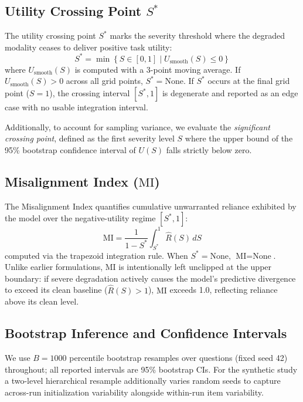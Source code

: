 \documentclass[graybox]{svmult}
\newcommand{\mi}{\text{MI}}
\begin{document}
\subsection{Utility Crossing Point $S^*$}
The utility crossing point $S^*$ marks the severity threshold where the degraded modality ceases to deliver positive task utility:
\begin{equation}
S^* = \min \left\{ S \in [0, 1] \mid U_{\text{smooth}}(S) \le 0 \right\}
\end{equation}
where $U_{\text{smooth}}(S)$ is computed with a 3-point moving average. If $U_{\text{smooth}}(S) > 0$ across all grid points, $S^* = \text{None}$. If $S^*$ occurs at the final grid point ($S=1$), the crossing interval $[S^*, 1]$ is degenerate and reported as an edge case with no usable integration interval.

Additionally, to account for sampling variance, we evaluate the \emph{significant crossing point}, defined as the first severity level $S$ where the upper bound of the 95\% bootstrap confidence interval of $U(S)$ falls strictly below zero.

\subsection{Misalignment Index ($\mi$)}
The Misalignment Index quantifies cumulative unwarranted reliance exhibited by the model over the negative-utility regime $[S^*, 1]$:
\begin{equation}
\mi = \frac{1}{1 - S^*} \int_{S^*}^1 \hat{R}(S) \, dS
\end{equation}
computed via the trapezoid integration rule. When $S^* = \text{None}$, $\mi = \text{None}$.
Unlike earlier formulations, $\mi$ is intentionally left unclipped at the upper boundary: if severe degradation actively causes the model's predictive divergence to exceed its clean baseline ($\hat{R}(S) > 1$), $\mi$ exceeds 1.0, reflecting reliance above its clean level.

\subsection{Bootstrap Inference and Confidence Intervals}
We use $B=1000$ percentile bootstrap resamples over questions (fixed seed 42) throughout; all reported intervals are 95\% bootstrap CIs. For the synthetic study a two-level hierarchical resample additionally varies random seeds to capture across-run initialization variability alongside within-run item variability.
\end{document}
